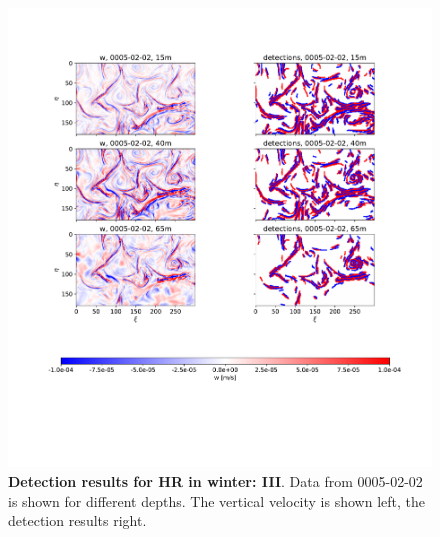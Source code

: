 \begin{figure}
    \centering
    \includegraphics[width=16cm, trim=2.5cm 0 0 2cm]{figures/eval_det_subm_winter3.pdf}
    \caption[Detection results for HR in winter: III]{\textbf{Detection results for HR in winter: III}. Data from 0005-02-02 is shown for different depths. The vertical velocity is shown left, the detection results right.}\label{fig:subm_det_winter3}
\end{figure}

